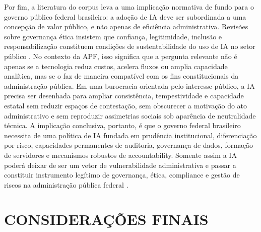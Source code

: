 \documentclass[12pt,a4paper]{article}
\begin{document}
Por fim, a literatura do corpus leva a uma implicação normativa de fundo para o governo público federal brasileiro: a adoção de IA deve ser subordinada a uma concepção de valor público, e não apenas de eficiência administrativa. Revisões sobre governança ética insistem que confiança, legitimidade, inclusão e responsabilização constituem condições de sustentabilidade do uso de IA no setor público \autocite{sigfrids2022how} \autocite{batool2025ai}. No contexto da APF, isso significa que a pergunta relevante não é apenas se a tecnologia reduz custos, acelera fluxos ou amplia capacidade analítica, mas se o faz de maneira compatível com os fins constitucionais da administração pública. Em uma burocracia orientada pelo interesse público, a IA precisa ser desenhada para ampliar consistência, tempestividade e capacidade estatal sem reduzir espaços de contestação, sem obscurecer a motivação do ato administrativo e sem reproduzir assimetrias sociais sob aparência de neutralidade técnica. A implicação conclusiva, portanto, é que o governo federal brasileiro necessita de uma política de IA fundada em prudência institucional, diferenciação por risco, capacidades permanentes de auditoria, governança de dados, formação de servidores e mecanismos robustos de accountability. Somente assim a IA poderá deixar de ser um vetor de vulnerabilidade administrativa e passar a constituir instrumento legítimo de governança, ética, compliance e gestão de riscos na administração pública federal \autocite{serra2024a} \autocite{goulart2025processos} \autocite{mkander2023auditing} \autocite{minkkinen2022continuous}.
\section{CONSIDERAÇÕES FINAIS}
\label{sec:org6df1468}
\end{document}
